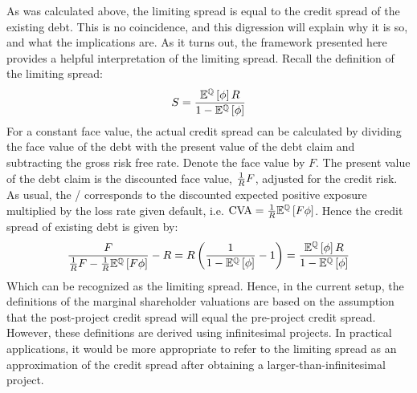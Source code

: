 \documentclass[main.tex]{subfiles}
\begin{document}
    As was calculated above, the limiting spread is equal to the credit spread of the existing debt.
    This is no coincidence, and this digression will explain why it is so,
    and what the implications are.
    As it turns out, 
    the framework presented here provides a helpful interpretation of the limiting spread.
    Recall the definition of the limiting spread:
        \begin{equation*}
            S
            =
            \frac{
                \mathbb{E}^{\mathbb{Q}}\left[\phi\right]
                R
            }{
                1
                -
                \mathbb{E}^{\mathbb{Q}}\left[\phi\right]
            }
        \end{equation*}
    For a constant face value,
    the actual credit spread can be calculated by dividing the face value of the debt
    with the present value of the debt claim and subtracting the gross risk free rate.
    Denote the face value by $F$. 
    The present value of the debt claim is the discounted face value, $\frac{1}{R} F$,
    adjusted for the credit risk. 
    As usual, the \CVA/ corresponds to the discounted expected positive exposure
    multiplied by the loss rate given default, 
    i.e. $\CVA/ = \discountfactor\mathbb{E}^{\rnmeasure}\left[F \phi \right] $.
    Hence the credit spread of existing debt is given by:
        \begin{equation*}
            \frac{
                F
            }{
                \frac{1}{R} F
                -
                \frac{1}{R}
                \mathbb{E}^{\mathbb{Q}}\left[
                    F \phi
                \right] 
            } 
            -
            R
            =
            R \left(
            \frac{
                1
            }{
                    1
                    -
                    \mathbb{E}^{\mathbb{Q}}\left[
                        \phi
                    \right] 
            } 
            - 
            1
            \right)
            =
            \frac{
                \mathbb{E}^{\mathbb{Q}}\left[\phi\right]
                R
            }{
                1
                -
                \mathbb{E}^{\mathbb{Q}}\left[\phi\right]
            }
        \end{equation*}
        Which can be recognized as the limiting spread. 
        Hence, in the current setup, 
        the definitions of the marginal shareholder valuations are based on
        the assumption that the post-project credit spread 
        will equal the pre-project credit spread.
        However, these definitions are derived using infinitesimal projects. 
        In practical applications,
        it would be more appropriate to refer to the limiting spread as an approximation 
        of the credit spread after obtaining a larger-than-infinitesimal project.
        
\end{document}
